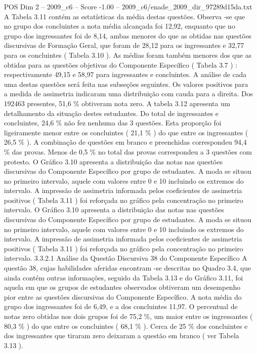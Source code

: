 \begin{textsample}{POS Dim 2 – 2009\_c6 – Score -1.00 – 2009\_c6/enade\_2009\_dir\_97289d15da.txt}
A Tabela 3.11 contém as estatísticas da média destas questões.
Observa -se que no grupo dos concluintes a nota média alcançada foi 12,92, enquanto que no grupo dos ingressantes foi de 8,14, ambas menores do que as obtidas nas questões discursivas de Formação Geral, que foram de 28,12 para os ingressantes e 32,77 para os concluintes ( Tabela 3.10 ).
As médias foram também menores dos que as obtidas para as questões objetivas do Componente Específico ( Tabela 3.7 ) : respectivamente 49,15 e 58,97 para ingressantes e concluintes.
A análise de cada uma destas questões será feita nas subseções seguintes.
Os valores positivos para a medida de assimetria indicaram uma distribuição com cauda para a direita.
Dos 192463 presentes, 51,6 \% obtiveram nota zero.
A tabela 3.12 apresenta um detalhamento da situação destes estudantes.
Do total de ingressantes e concluintes, 24,6 \% não fez nenhuma das 3 questões.
Esta proporção foi ligeiramente menor entre os concluintes ( 21,1 \% ) do que entre os ingressantes ( 26,5 \% ).
A combinação de questões em branco e preenchidas correspondeu 94,4 \% das provas.
Menos de 0,5 \% no total das provas correspondeu a 3 questões com protesto.
O Gráfico 3.10 apresenta a distribuição das notas nas questões discursivas do Componente Específico por grupo de estudantes.
A moda se situou no primeiro intervalo, aquele com valores entre 0 e 10 incluindo os extremos do intervalo.
A impressão de assimetria informada pelos coeficientes de assimetria positivos ( Tabela 3.11 ) foi reforçada no gráfico pela concentração no primeiro intervalo.
O Gráfico 3.10 apresenta a distribuição das notas nas questões discursivas do Componente Específico por grupo de estudantes.
A moda se situou no primeiro intervalo, aquele com valores entre 0 e 10 incluindo os extremos do intervalo.
A impressão de assimetria informada pelos coeficientes de assimetria positivos ( Tabela 3.11 ) foi reforçada no gráfico pela concentração no primeiro intervalo. 3.3.2.1 Análise da Questão Discursiva 38 do Componente Específico A questão 38, cujas habilidades aferidas encontram -se descritas no Quadro 3.4, que ainda contém outras informações, seguido da Tabela 3.13 e do Gráfico 3.11, foi aquela em que os grupos de estudantes observados obtiveram um desempenho pior entre as questões discursivas do Componente Específico.
A nota média do grupo dos ingressantes foi de 6,49, e a dos concluintes 11,97.
O percentual de notas zero obtidas nos dois grupos foi de 75,2 \%, um maior entre os ingressantes ( 80,3 \% ) do que entre os concluintes ( 68,1 \% ).
Cerca de 25 \% dos concluintes e dos ingressantes que tiraram zero deixaram a questão em branco ( ver Tabela 3.13 ).

\end{textsample}

